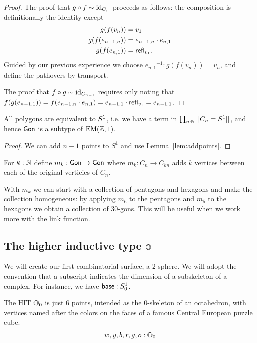 \begin{proof}
The proof that \( g\circ f\sim\text{id}_{C_n} \) proceeds as follows: the composition is definitionally the identity except 
\begin{align*}
g(f(v_n))&=v_1\\
g(f(e_{n-1,n}))&=e_{n-1,n}\cdot e_{n,1}\\
g(f(e_{n,1}))&= \mathsf{refl}_{v_1}.
\end{align*}
Guided by our previous experience we choose \( {e_{n,1}}^{-1}:g(f(v_n))=v_n \), and define the pathovers by transport.

The proof that \( f\circ g\sim\text{id}_{C_{n-1}} \) requires only noting that \( f(g(e_{n-1,1}))=f(e_{n-1,n}\cdot e_{n,1})=e_{n-1,1}\cdot\mathsf{refl}_{v_1}=e_{n-1,1} \).
\end{proof}

\begin{mycor}
All polygons are equivalent to \( S^1 \), i.e. we have a term in \( \prod_{n:\mathbb{N}}||C_n=S^1|| \), and hence \( \mathsf{Gon} \) is a subtype of \( \mathrm{EM}(\mathbb{Z},1) \).
\end{mycor}
\begin{proof}
We can add \( n-1 \) points to \( S^1 \) and use Lemma~\ref{lem:addpoints}.
\end{proof}

\begin{mydef}
For \( k:\mathbb{N} \) define \( m_k:\mathsf{Gon}\to\mathsf{Gon} \) where \( m_k:C_n\to C_{kn} \) adds \( k \) vertices between each of the original verticies of \( C_n \).
\end{mydef}

With \( m_k \) we can start with a collection of pentagons and hexagons and make the collection homogeneous: by applying \( m_6 \) to the pentagons and \( m_5 \) to the hexagons we obtain a collection of 30-gons. This will be useful when we work more with the link function.

\subsection{\texorpdfstring{The higher inductive type \( \mathbb{O} \)}{The higher inductive type O}}

We will create our first combinatorial surface, a 2-sphere. We will adopt the convention that a subscript indicates the dimension of a subskeleton of a complex. For instance, we have \( \mathsf{base}:S^1_0 \).

\begin{mydef}
The HIT \( \mathbb{O}_0 \) is just 6 points, intended as the 0-skeleton of an octahedron, with vertices named after the colors on the faces of a famous Central European puzzle cube.
\[ w, y, b, r, g, o : \mathbb{O}_0 \]
\end{mydef}

